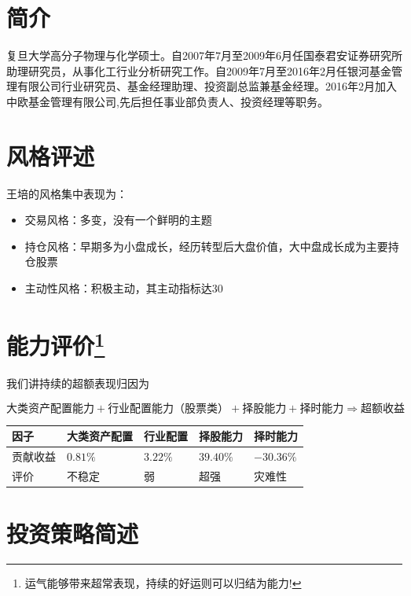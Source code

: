\documentclass[journal=jacsat,manuscript=article]{achemso}
\begin{document}
\section{简介}

复旦大学高分子物理与化学硕士。自2007年7月至2009年6月任国泰君安证券研究所助理研究员，从事化工行业分析研究工作。自2009年7月至2016年2月任银河基金管理有限公司行业研究员、基金经理助理、投资副总监兼基金经理。2016年2月加入中欧基金管理有限公司,先后担任事业部负责人、投资经理等职务。

\section{风格评述}

王培的风格集中表现为：

\begin{itemize}
\item 交易风格：多变，没有一个鲜明的主题
\item 持仓风格：早期多为小盘成长，经历转型后大盘价值，大中盘成长成为主要持仓股票
\item 主动性风格：积极主动，其主动指标达30%
\end{itemize}

\section{\texorpdfstring{能力评价\footnote{运气能够带来超常表现，持续的好运则可以归结为能力!}}{能力评价}}

我们讲持续的超额表现归因为

\begin{equation}
\mbox{大类资产配置能力} + \mbox{行业配置能力（股票类）}+ \mbox{择股能力} + \mbox{择时能力} \Rightarrow \mbox{超额收益}
\end{equation}

\begin{table}
  \begin{tabular}{l|llll}
    因子 &大类资产配置  & 行业配置  & 择股能力 & 择时能力  \\ \hline
    贡献收益 & $0.81\%$   & $3.22\%$ & $39.40\%$ &  $-30.36\%$  \\
    评价 & 不稳定 & 弱 & 超强 & 灾难性  \\ \hline
  \end{tabular}
\end{table}

\section{投资策略简述}
\end{document}
